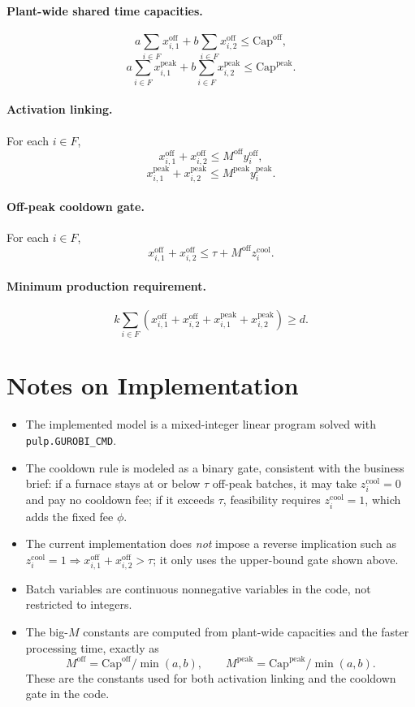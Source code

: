 \paragraph{Plant-wide shared time capacities.}
\[
a\sum_{i\in F}x_{i,1}^{\text{off}} + b\sum_{i\in F}x_{i,2}^{\text{off}} \le \mathrm{Cap}^{\text{off}},
\]
\[
a\sum_{i\in F}x_{i,1}^{\text{peak}} + b\sum_{i\in F}x_{i,2}^{\text{peak}} \le \mathrm{Cap}^{\text{peak}}.
\]

\paragraph{Activation linking.}
For each $i\in F$,
\[
x_{i,1}^{\text{off}} + x_{i,2}^{\text{off}} \le M^{\text{off}} y_i^{\text{off}},
\]
\[
x_{i,1}^{\text{peak}} + x_{i,2}^{\text{peak}} \le M^{\text{peak}} y_i^{\text{peak}}.
\]

\paragraph{Off-peak cooldown gate.}
For each $i\in F$,
\[
x_{i,1}^{\text{off}} + x_{i,2}^{\text{off}} \le \tau + M^{\text{off}} z_i^{\text{cool}}.
\]

\paragraph{Minimum production requirement.}
\[
k\sum_{i\in F}\left(
x_{i,1}^{\text{off}} + x_{i,2}^{\text{off}} + x_{i,1}^{\text{peak}} + x_{i,2}^{\text{peak}}
\right)\ge d.
\]

\section*{Notes on Implementation}

\begin{itemize}
    \item The implemented model is a mixed-integer linear program solved with \texttt{pulp.GUROBI\_CMD}.
    \item The cooldown rule is modeled as a binary gate, consistent with the business brief: if a furnace stays at or below $\tau$ off-peak batches, it may take $z_i^{\text{cool}}=0$ and pay no cooldown fee; if it exceeds $\tau$, feasibility requires $z_i^{\text{cool}}=1$, which adds the fixed fee $\phi$.
    \item The current implementation does \emph{not} impose a reverse implication such as $z_i^{\text{cool}}=1 \Rightarrow x_{i,1}^{\text{off}} + x_{i,2}^{\text{off}}>\tau$; it only uses the upper-bound gate shown above.
    \item Batch variables are continuous nonnegative variables in the code, not restricted to integers.
    \item The big-$M$ constants are computed from plant-wide capacities and the faster processing time, exactly as
    \[
    M^{\text{off}}=\mathrm{Cap}^{\text{off}}/\min(a,b),\qquad
    M^{\text{peak}}=\mathrm{Cap}^{\text{peak}}/\min(a,b).
    \]
    These are the constants used for both activation linking and the cooldown gate in the code.
\end{itemize}

